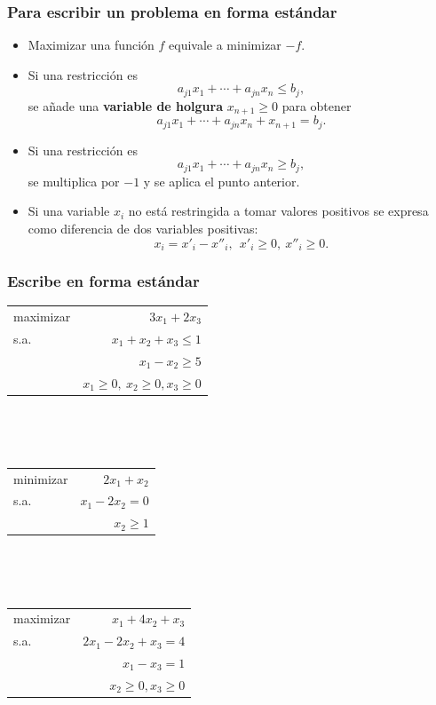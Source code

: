 \documentclass{beamer}
\begin{document}
\begin{frame}
\frametitle{Para escribir un problema en forma estándar}



\begin{itemize}

\item Maximizar una función $f$ equivale a minimizar $-f$.

\item Si una restricción es   
\[
a_{j1}x_1+\cdots + a_{jn}x_n \leq b_j,
\] se añade una \textbf{variable de holgura} $x_{n+1}\geq 0$ para obtener 
\[
a_{j1}x_1+\cdots + a_{jn}x_n + x_{n+1} = b_j.
\]

\item Si una restricción es   
\[
a_{j1}x_1+\cdots + a_{jn}x_n \geq b_j,
\]
se multiplica por $-1$ y se aplica el punto anterior.

\item Si una variable $x_i$ no está restringida a tomar valores positivos se expresa como diferencia de dos variables positivas:
\[
x_i = x'_i-x''_i, \ \ x'_i\geq 0, \ x''_i\geq 0.
\]

\end{itemize}




\end{frame}
\begin{frame}
\frametitle{Escribe en forma estándar}



\begin{tabular}{lr}
maximizar & $3x_1 + 2x_3$ \\
s.a. & $x_1+ x_2 + x_3 \leq 1$    \\
	& $x_1 - x_2 \geq 5$ \\
	 & $x_1\geq 0,\ x_2\geq 0, x_3\geq 0$
\end{tabular}


\

\


\begin{tabular}{lr}
minimizar & $2x_1 + x_2$ \\
s.a. & $x_1 - 2x_2 = 0$    \\
	 & $x_2\geq 1$
\end{tabular}

\

\

\begin{tabular}{lr}
maximizar & $x_1 + 4x_2+x_3$ \\
s.a. & $2x_1 - 2x_2 + x_3 = 4$    \\
	& $x_1 - x_3 = 1$ \\
	 & $x_2\geq 0, x_3\geq 0$
\end{tabular}


\end{frame}
\end{document}
